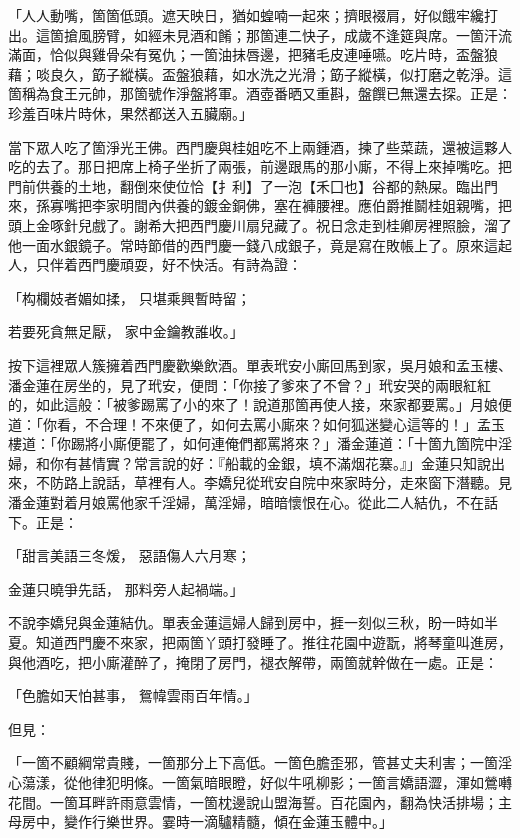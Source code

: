 \begin{showcontents}{}
「人人動嘴，箇箇低頭。遮天映日，猶如蝗喃一起來；擠眼裰肩，好似餓牢纔打出。這箇搶風膀臂，如經未見酒和餚；那箇連二快子，成歲不逢筵與席。一箇汗流滿面，恰似與雞骨朵有冤仇；一箇油抹唇邊，把豬毛皮連唾嚥。吃片時，盃盤狼藉；啖良久，筯子縱橫。盃盤狼藉，如水洗之光滑；筯子縱橫，似打磨之乾淨。這箇稱為食王元帥，那箇號作淨盤將軍。酒壺番晒又重斟，盤饌已無還去探。正是：珍羞百味片時休，果然都送入五臟廟。」

當下眾人吃了箇淨光王佛。西門慶與桂姐吃不上兩鍾酒，揀了些菜蔬，還被這夥人吃的去了。那日把席上椅子坐折了兩張，前邊跟馬的那小廝，不得上來掉嘴吃。把門前供養的土地，翻倒來使位恰【扌利】了一泡【禾囗也】谷都的熱屎。臨出門來，孫寡嘴把李家明間內供養的鍍金銅佛，塞在褲腰裡。應伯爵推鬬桂姐親嘴，把頭上金啄針兒戲了。謝希大把西門慶川扇兒藏了。祝日念走到桂卿房裡照臉，溜了他一面水銀鏡子。常時節借的西門慶一錢八成銀子，竟是寫在敗帳上了。原來這起人，只伴着西門慶頑耍，好不快活。有詩為證：

「构欄妓者媚如揉，  只堪乘興暫時留；

若要死貪無足厭，  家中金鑰教誰收。」

按下這裡眾人簇擁着西門慶歡樂飲酒。單表玳安小廝回馬到家，吳月娘和孟玉樓、潘金蓮在房坐的，見了玳安，便問：「你接了爹來了不曾？」玳安哭的兩眼紅紅的，如此這般：「被爹踢罵了小的來了！說道那箇再使人接，來家都要罵。」月娘便道：「你看，不合理！不來便了，如何去罵小廝來？如何狐迷變心這等的！」孟玉樓道：「你踢將小廝便罷了，如何連俺們都罵將來？」潘金蓮道：「十箇九箇院中淫婦，和你有甚情實？常言說的好：『船載的金銀，填不滿烟花寨。』」金蓮只知說出來，不防路上說話，草裡有人。李嬌兒從玳安自院中來家時分，走來窗下潛聽。見潘金蓮對着月娘罵他家千淫婦，萬淫婦，暗暗懷恨在心。從此二人結仇，不在話下。正是：

「甜言美語三冬煖，  惡語傷人六月寒；

金蓮只曉爭先話，  那料旁人起禍端。」

不說李嬌兒與金蓮結仇。單表金蓮這婦人歸到房中，捱一刻似三秋，盼一時如半夏。知道西門慶不來家，把兩箇丫頭打發睡了。推往花園中遊翫，將琴童叫進房，與他酒吃，把小廝灌醉了，掩閉了房門，褪衣解帶，兩箇就幹做在一處。正是：

「色膽如天怕甚事，  鴛幃雲雨百年情。」

但見：

「一箇不顧綱常貴賤，一箇那分上下高低。一箇色膽歪邪，管甚丈夫利害；一箇淫心蕩漾，從他律犯明條。一箇氣暗眼瞪，好似牛吼柳影；一箇言嬌語澀，渾如鶯囀花間。一箇耳畔許雨意雲情，一箇枕邊說山盟海誓。百花園內，翻為快活排場；主母房中，變作行樂世界。霎時一滴驢精髓，傾在金蓮玉體中。」


\end{showcontents}

